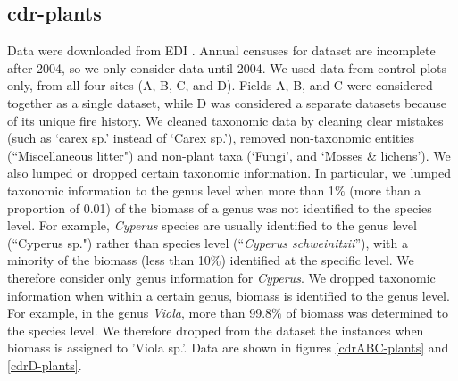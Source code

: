 \documentclass[11pt, oneside]{article}
\begin{document}
\subsection {cdr-plants}
Data were downloaded from EDI \citep{cdr-plants}.
Annual censuses for dataset are incomplete after 2004, so we only consider data until 2004. 
We used data from control plots only, from all four sites (A, B, C, and D). 
Fields A, B, and C were considered together as a single dataset, while D was considered a separate datasets because of its unique fire history.
We cleaned taxonomic data by cleaning clear mistakes (such as `carex sp.' instead of `Carex sp.'), removed non-taxonomic entities (``Miscellaneous litter") and non-plant taxa (`Fungi', and `Mosses \& lichens').
We also lumped or dropped certain taxonomic information. 
In particular, we lumped taxonomic information to the genus level when more than 1$\%$ (more than a proportion of 0.01) of the biomass of a genus was not identified to the species level. 
For example, {\it Cyperus} species are usually identified to the genus level (``Cyperus  sp.") rather than species level (``{\it Cyperus schweinitzii}''), with a minority of the biomass (less than 10$\%$) identified at the specific level. We therefore consider only genus information for {\it Cyperus}. 
We dropped taxonomic information when within a certain genus, biomass is identified to the genus level. 
For example, in the genus {\it Viola}, more than 99.8$\%$ of biomass was determined to the species level. We therefore dropped from the dataset the instances when biomass is assigned to 'Viola sp.'.
Data are shown in figures \ref{cdrABC-plants} and \ref{cdrD-plants}.
\end{document}
